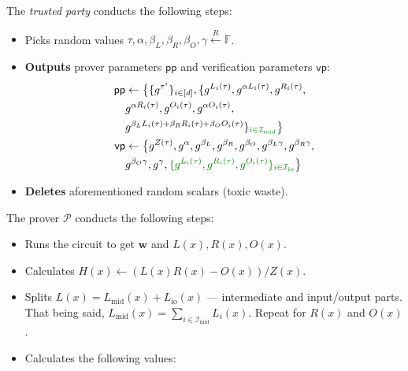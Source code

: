 \documentclass[../lecture-notes.tex]{subfiles}
\begin{document}
\begin{tcolorbox}
    The \emph{trusted party} conducts the following steps:
    \begin{itemize}[label=, left=0mm]
        \item Picks random values $\tau, \alpha, \beta_L, \beta_R, \beta_O, \gamma \xleftarrow{R} \mathbb{F}$.
        \item \textbf{Outputs} prover parameters $\mathsf{pp}$ and verification parameters $\mathsf{vp}$:
        \begin{equation*}
            \begin{aligned}
                \mathsf{pp} & \gets \big\{\{g^{\tau^i}\}_{i \in [d]}, \{g^{L_i(\tau)}, g^{\alpha L_i(\tau)}, g^{R_i(\tau)}, \\
                            & g^{\alpha R_i(\tau)}, g^{O_i(\tau)}, g^{\alpha O_i(\tau)}, \\
                            & g^{\beta_LL_i(\tau)+\beta_RR_i(\tau)+\beta_OO_i(\tau)}\}_{\textcolor{green!50!black}{i \in \mathcal{I}_{\text{mid}}}}\big\} \\
                \mathsf{vp} & \gets \big\{ g^{Z(\tau)}, g^{\alpha}, g^{\beta_L}, g^{\beta_R}, g^{\beta_O}, g^{\beta_L\gamma}, g^{\beta_R\gamma}, \\ 
                            & g^{\beta_O\gamma}, g^{\gamma}, \textcolor{green!50!black}{ \{g^{L_i(\tau)}, g^{R_i(\tau)}, g^{O_i(\tau)}\}_{i \in \mathcal{I}_{\text{io}}} } \big\}
            \end{aligned}
        \end{equation*}
        \item \textbf{Deletes} aforementioned random scalars (toxic waste).
    \end{itemize}
    The prover $\mathcal{P}$ conducts the following steps:
    \begin{itemize}[label=, left=0mm]
        \item Runs the circuit to get $\mathbf{w}$ and $L(x),R(x),O(x)$.
        \item Calculates $H(x) \gets (L(x)R(x) - O(x))\big/ Z(x)$.
        \item \textcolor{green!50!black}{Splits $L(x) = L_{\text{mid}}(x) + L_{\text{io}}(x)$ --- intermediate and input/output parts. That being said, $L_{\text{mid}}(x) = \sum_{i \in \mathcal{I}_{\text{mid}}}L_i(x)$. Repeat for $R(x)$ and $O(x)$.}
        \item Calculates the following values: 

\end{itemize}
\end{tcolorbox}
\end{document}
